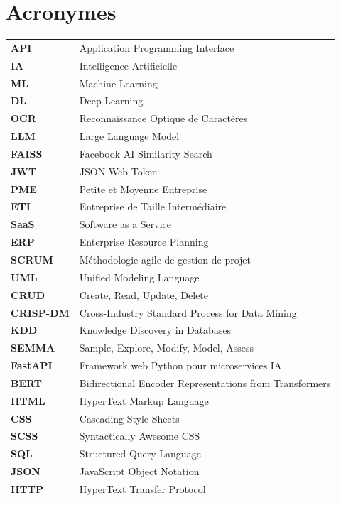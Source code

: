 \documentclass[12pt,a4paper]{report}
\let\oldchapter\chapter
\def\chapter{\clearpage\setcounter{section}{0}\oldchapter}
\begin{document}
\chapter*{Acronymes}
\vspace*{-20pt}
\vspace*{-\baselineskip}
\begin{longtable}{ll}
\textbf{API} & Application Programming Interface \\
\textbf{IA} & Intelligence Artificielle \\
\textbf{ML} & Machine Learning \\
\textbf{DL} & Deep Learning \\
\textbf{OCR} & Reconnaissance Optique de Caractères \\
\textbf{LLM} & Large Language Model \\
\textbf{FAISS} & Facebook AI Similarity Search \\
\textbf{JWT} & JSON Web Token \\
\textbf{PME} & Petite et Moyenne Entreprise \\
\textbf{ETI} & Entreprise de Taille Intermédiaire \\
\textbf{SaaS} & Software as a Service \\
\textbf{ERP} & Enterprise Resource Planning \\
\textbf{SCRUM} & Méthodologie agile de gestion de projet \\
\textbf{UML} & Unified Modeling Language \\
\textbf{CRUD} & Create, Read, Update, Delete \\
\textbf{CRISP-DM} & Cross-Industry Standard Process for Data Mining \\
\textbf{KDD} & Knowledge Discovery in Databases \\
\textbf{SEMMA} & Sample, Explore, Modify, Model, Assess \\
\textbf{FastAPI} & Framework web Python pour microservices IA \\
\textbf{BERT} & Bidirectional Encoder Representations from Transformers \\
\textbf{HTML} & HyperText Markup Language \\
\textbf{CSS} & Cascading Style Sheets \\
\textbf{SCSS} & Syntactically Awesome CSS \\
\textbf{SQL} & Structured Query Language \\
\textbf{JSON} & JavaScript Object Notation \\
\textbf{HTTP} & HyperText Transfer Protocol \\

\end{longtable}
\end{document}
